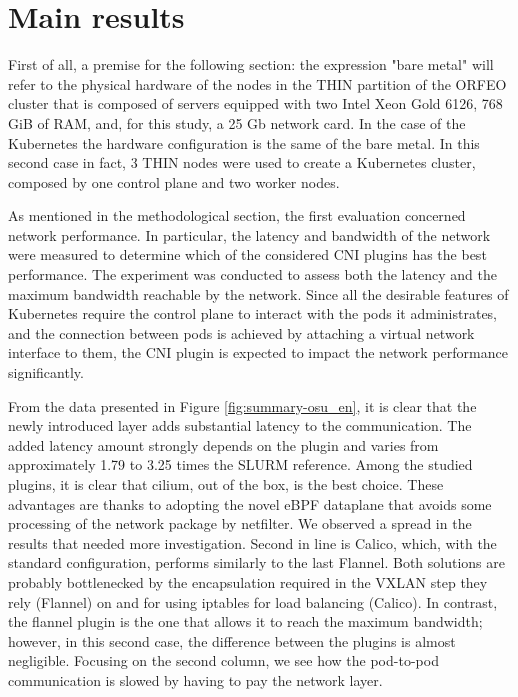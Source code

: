 \section*{Main results}

First of all, a premise for the following section: the expression "bare metal"
will refer to the physical hardware of the nodes in the THIN partition of the
ORFEO cluster that is composed of servers equipped with two Intel Xeon Gold
6126, 768 GiB of RAM, and, for this study, a 25 Gb network card.
In the case of the Kubernetes the hardware configuration is the same of the bare
metal. In this second case in fact, 3 THIN nodes were used to create a
Kubernetes cluster, composed by one control plane and two worker nodes.

As mentioned in the methodological section, the first evaluation concerned
network performance. In particular, the latency and bandwidth of the network
were measured to determine which of the considered CNI plugins has the best
performance. The experiment was conducted to assess both the latency and the
maximum bandwidth reachable by the network. Since all the desirable features of
Kubernetes require the control plane to interact with the pods it administrates,
and the connection between pods is achieved by attaching a virtual network
interface to them, the CNI plugin is expected to impact the network performance
significantly.

From the data presented in Figure \ref{fig:summary-osu_en}, it is clear that the
newly introduced layer adds substantial latency to the communication. The added
latency amount strongly depends on the plugin and varies from approximately 1.79
to 3.25 times the SLURM reference. Among the studied plugins, it is clear that
cilium, out of the box, is the best choice. These advantages are thanks to
adopting the novel eBPF dataplane that avoids some processing of the network
package by netfilter. We observed a spread in the results that needed more
investigation. Second in line is Calico, which, with the standard configuration,
performs similarly to the last Flannel.
Both solutions are probably bottlenecked by the encapsulation required in the
VXLAN step they rely (Flannel) on and for using iptables for load balancing
(Calico).
In contrast, the flannel plugin is the one that allows it to reach the maximum
bandwidth; however, in this second case, the difference between the plugins is
almost negligible. Focusing on the second column, we see how the pod-to-pod
communication is slowed by having to pay the network layer.

